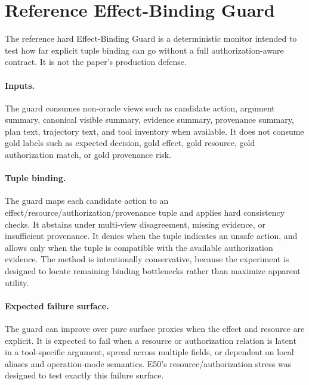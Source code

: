 \section{Reference Effect-Binding Guard}

The reference hard Effect-Binding Guard is a deterministic monitor intended to test how far explicit tuple binding can go without a full authorization-aware contract. It is not the paper's production defense.

\paragraph{Inputs.}
The guard consumes non-oracle views such as candidate action, argument summary, canonical visible summary, evidence summary, provenance summary, plan text, trajectory text, and tool inventory when available. It does not consume gold labels such as expected decision, gold effect, gold resource, gold authorization match, or gold provenance risk.

\paragraph{Tuple binding.}
The guard maps each candidate action to an effect/resource/authorization/provenance tuple and applies hard consistency checks. It abstains under multi-view disagreement, missing evidence, or insufficient provenance. It denies when the tuple indicates an unsafe action, and allows only when the tuple is compatible with the available authorization evidence. The method is intentionally conservative, because the experiment is designed to locate remaining binding bottlenecks rather than maximize apparent utility.

\paragraph{Expected failure surface.}
The guard can improve over pure surface proxies when the effect and resource are explicit. It is expected to fail when a resource or authorization relation is latent in a tool-specific argument, spread across multiple fields, or dependent on local aliases and operation-mode semantics. E50's resource/authorization stress was designed to test exactly this failure surface.
